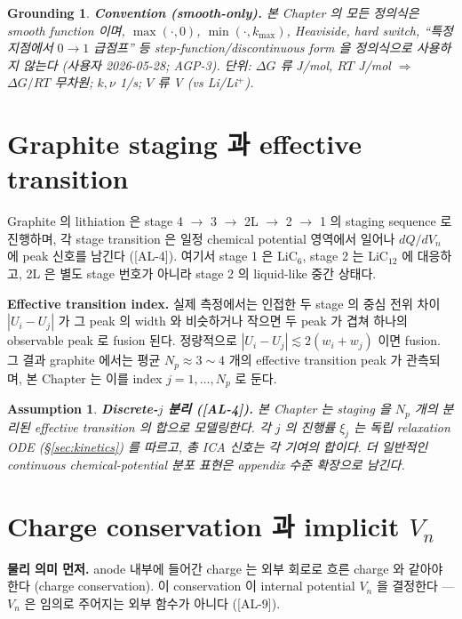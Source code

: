 \documentclass[11pt,a4paper]{article}
\newtheorem*{assumptionbox}{Assumption}
\newtheorem*{groundingbox}{Grounding}
\newcommand{\AL}[1]{\textsf{[AL-#1]}}
\begin{document}
\begin{groundingbox}
\textbf{Convention (smooth-only).} 본 Chapter 의 모든 정의식은 smooth function 이며,
$\max(\cdot,0)$, $\min(\cdot,k_{\max})$, Heaviside, hard switch, ``특정 지점에서 $0\!\to\!1$
급점프'' 등 step-function/discontinuous form 을 정의식으로 사용하지 않는다 (사용자
2026-05-28; AGP-3). 단위: $\Delta G$ 류 J/mol, $RT$ J/mol $\Rightarrow$ $\Delta G/RT$
무차원; $k,\nu$ 1/s; $V$ 류 V (vs Li/Li$^+$).
\end{groundingbox}

\section{Graphite staging 과 effective transition}\label{sec:staging}
Graphite 의 lithiation 은 stage 4 $\to$ 3 $\to$ 2L $\to$ 2 $\to$ 1 의 staging
sequence 로 진행하며, 각 stage transition 은 일정 chemical potential 영역에서 일어나
$dQ/dV_n$ 에 peak 신호를 남긴다 \cite{dahn1991,ohzuku1993,asenbauer2020} (\AL{4}). 여기서 stage 1 은
LiC$_6$, stage 2 는 LiC$_{12}$ 에 대응하고, 2L 은 별도 stage 번호가 아니라 stage 2 의
liquid-like 중간 상태다.

\textbf{Effective transition index.} 실제 측정에서는 인접한 두 stage 의 중심 전위 차이
$|U_i-U_j|$ 가 그 peak 의 width 와 비슷하거나 작으면 두 peak 가 겹쳐 하나의 observable
peak 로 fusion 된다. 정량적으로 $|U_i-U_j|\lesssim 2(w_i+w_j)$ 이면 fusion. 그 결과
graphite 에서는 평균 $N_p\approx3\sim4$ 개의 effective transition peak 가 관측되며, 본
Chapter 는 이를 index $j=1,\dots,N_p$ 로 둔다.

\begin{assumptionbox}
\textbf{Discrete-$j$ 분리 (\AL{4}).} 본 Chapter 는 staging 을 $N_p$ 개의 분리된
effective transition 의 합으로 모델링한다. 각 $j$ 의 진행률 $\xi_j$ 는 독립 relaxation
ODE (\S\ref{sec:kinetics}) 를 따르고, 총 ICA 신호는 각 기여의 합이다. 더 일반적인
continuous chemical-potential 분포 표현은 appendix 수준 확장으로 남긴다.
\end{assumptionbox}

\section{Charge conservation 과 implicit $V_n$}\label{sec:charge}
\textbf{물리 의미 먼저.} anode 내부에 들어간 charge 는 외부 회로로 흐른 charge 와
같아야 한다 (charge conservation). 이 conservation 이 internal potential $V_n$ 을
결정한다 — $V_n$ 은 임의로 주어지는 외부 함수가 아니다 (\AL{9}).
\end{document}

